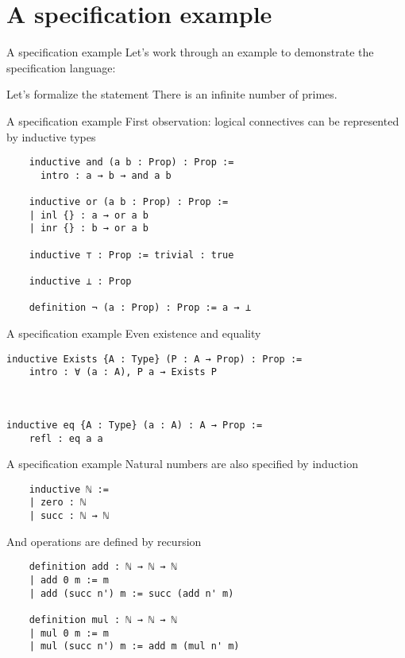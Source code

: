 \documentclass{beamer}
\begin{document}
\section{A specification example}

\begin{frame}{A specification example}
  Let's work through an example to demonstrate the specification
  language:
  \begin{block}{Let's formalize the statement}
    There is an infinite number of primes.
  \end{block}
\end{frame}

\begin{frame}[fragile]{A specification example}
  First observation: logical connectives can be represented by
  inductive types
  \begin{lstlisting}
    inductive and (a b : Prop) : Prop :=
      intro : a → b → and a b

    inductive or (a b : Prop) : Prop :=
    | inl {} : a → or a b
    | inr {} : b → or a b

    inductive ⊤ : Prop := trivial : true

    inductive ⊥ : Prop

    definition ¬ (a : Prop) : Prop := a → ⊥

  \end{lstlisting}
  
\end{frame}
\begin{frame}[fragile]{A specification example}
  Even existence and equality
  \begin{lstlisting}
inductive Exists {A : Type} (P : A → Prop) : Prop :=
    intro : ∀ (a : A), P a → Exists P

    

inductive eq {A : Type} (a : A) : A → Prop :=
    refl : eq a a
  \end{lstlisting}
  
\end{frame}

\begin{frame}[fragile]{A specification example}
  Natural numbers are also specified by induction
  \begin{lstlisting}
    inductive ℕ :=
    | zero : ℕ
    | succ : ℕ → ℕ
  \end{lstlisting}
  And operations are defined by recursion
  \begin{lstlisting}
    definition add : ℕ → ℕ → ℕ
    | add 0 m := m
    | add (succ n') m := succ (add n' m)

    definition mul : ℕ → ℕ → ℕ
    | mul 0 m := m
    | mul (succ n') m := add m (mul n' m)
  \end{lstlisting}
\end{frame}
\end{document}
